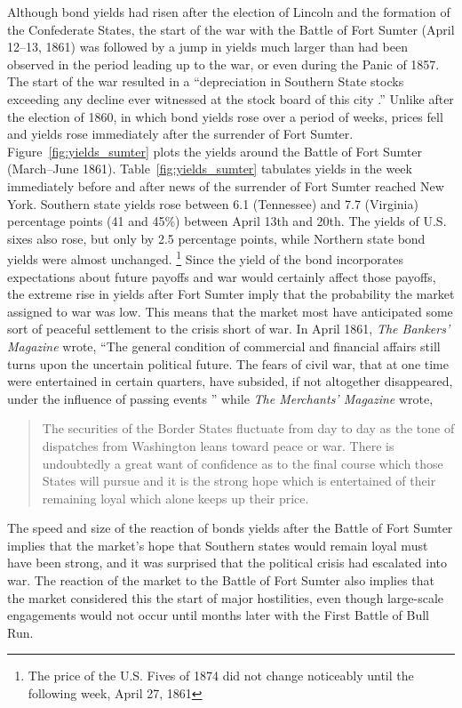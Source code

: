 \documentclass[]{article}\usepackage[]{graphicx}\usepackage[]{color}
\begin{document}
Although bond yields had risen after the election of Lincoln and the formation of the Confederate States, the start of the war with the Battle of Fort Sumter (April 12--13, 1861) was followed by a jump in yields much larger than had been observed in the period leading up to the war, or even during the Panic of 1857.
The start of the war resulted in a ``depreciation in Southern State stocks exceeding any decline ever witnessed at the stock board of this city \parencite[919]{BankersMagazine1860}.''
Unlike after the election of 1860, in which bond yields rose over a period of weeks, prices fell and yields rose immediately after the surrender of Fort Sumter.
Figure~\ref{fig:yields_sumter} plots the yields around the Battle of Fort Sumter (March--June 1861).
Table~\ref{fig:yields_sumter} tabulates yields in the week immediately before and after news of the surrender of Fort Sumter reached New York.
Southern state yields rose between 6.1 (Tennessee) and 7.7 (Virginia) percentage points (41 and 45\%) between April 13th and 20th.
The yields of U.S. sixes also rose, but only by 2.5 percentage points,
while Northern state bond yields were almost unchanged.%
\footnote{The price of the U.S. Fives of 1874 did not change noticeably until the following week, April 27, 1861}
Since the yield of the bond incorporates expectations about future payoffs and war would certainly affect those payoffs, the extreme rise in yields after Fort Sumter imply that the probability the market assigned to war was low.
This means that the market most have anticipated some sort of peaceful settlement to the crisis short of war.
In April 1861, \textit{The Bankers' Magazine} wrote, ``The general condition of commercial and financial affairs still turns upon the uncertain political future. The fears of civil war, that at one time were entertained in certain quarters, have subsided, if not altogether disappeared, under the influence of passing events \parencite[413]{HomansDana1861a}''
while \textit{The Merchants' Magazine} wrote,
\begin{quotation}
  The securities of the Border States fluctuate from day to day as the tone of dispatches from Washington leans toward peace or war.
  There is undoubtedly a great want of confidence as to the final course which those States will pursue and it is the strong hope which is entertained of their remaining loyal which alone keeps up their price. \parencite[838]{BankersMagazine1860}
\end{quotation}
The speed and size of the reaction of bonds yields after the Battle of Fort Sumter implies that the market's hope that Southern states would remain loyal must have been strong, and it was surprised that the political crisis had escalated into war.
The reaction of the market to the Battle of Fort Sumter also implies that the market considered this the start of major hostilities, even though large-scale engagements would not occur until months later with the First Battle of Bull Run.
\end{document}
